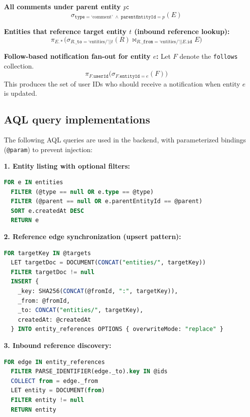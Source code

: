 \documentclass[13pt,a4paper]{report}
\begin{document}
\textbf{All comments under parent entity $p$:}
\[
\sigma_{\texttt{type}=\text{`comment'} \;\land\; \texttt{parentEntityId}=p}(E)
\]

\textbf{Entities that reference target entity $t$ (inbound reference lookup):}
\[
\pi_{E.*}\bigl(\sigma_{R.\texttt{\_to}=\text{`entities/'}||t}(R) \bowtie_{R.\texttt{\_from}=\text{`entities/'}||E.\texttt{id}} E\bigr)
\]

\textbf{Follow-based notification fan-out for entity $e$:}
Let $F$ denote the \texttt{follows} collection.
\[
\pi_{F.\texttt{userId}}\bigl(\sigma_{F.\texttt{entityId}=e}(F)\bigr)
\]
This produces the set of user IDs who should receive a notification when entity $e$ is updated.

\subsection{AQL query implementations}
The following AQL queries are used in the backend, with parameterized bindings (\texttt{@param}) to prevent injection:

\textbf{1. Entity listing with optional filters:}
\begin{lstlisting}[language=SQL,caption={Entity listing query},label={lst:entity-list}]
FOR e IN entities
  FILTER (@type == null OR e.type == @type)
  FILTER (@parent == null OR e.parentEntityId == @parent)
  SORT e.createdAt DESC
  RETURN e
\end{lstlisting}

\textbf{2. Reference edge synchronization (upsert pattern):}
\begin{lstlisting}[language=SQL,caption={Reference edge synchronization},label={lst:ref-sync}]
FOR targetKey IN @targets
  LET targetDoc = DOCUMENT(CONCAT("entities/", targetKey))
  FILTER targetDoc != null
  INSERT {
    _key: SHA256(CONCAT(@fromId, ":", targetKey)),
    _from: @fromId,
    _to: CONCAT("entities/", targetKey),
    createdAt: @createdAt
  } INTO entity_references OPTIONS { overwriteMode: "replace" }
\end{lstlisting}

\textbf{3. Inbound reference discovery:}
\begin{lstlisting}[language=SQL,caption={Inbound reference lookup},label={lst:ref-lookup}]
FOR edge IN entity_references
  FILTER PARSE_IDENTIFIER(edge._to).key IN @ids
  COLLECT from = edge._from
  LET entity = DOCUMENT(from)
  FILTER entity != null
  RETURN entity
\end{lstlisting}
\end{document}
